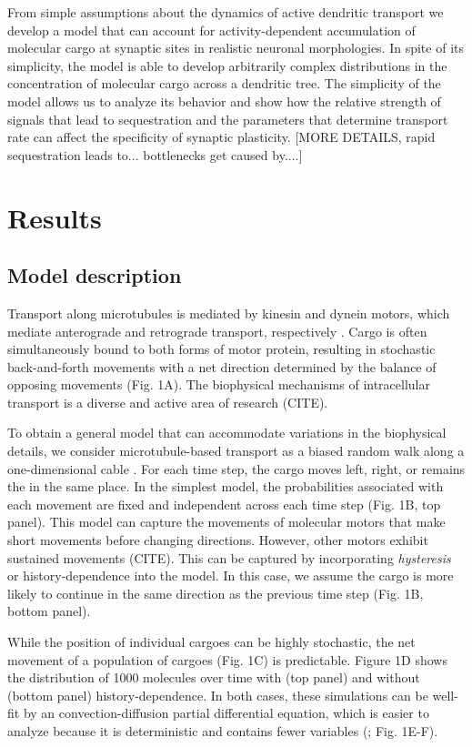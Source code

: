 \documentclass[fleqn,10pt]{wlpeerj}
\begin{document}
From simple assumptions about the dynamics of active dendritic transport we develop a model that can account for activity-dependent accumulation of molecular cargo at synaptic sites in realistic neuronal morphologies. In spite of its simplicity, the model is able to develop arbitrarily complex distributions in the concentration of molecular cargo across a dendritic tree. The simplicity of the model allows us to analyze its behavior and show how the relative strength of signals that lead to sequestration and the parameters that determine transport rate can affect the specificity of synaptic plasticity. [MORE DETAILS, rapid sequestration leads to... bottlenecks get caused by....]


\section*{Results}

\subsection*{Model description}

Transport along microtubules is mediated by kinesin and dynein motors, which mediate anterograde and retrograde transport, respectively \citep{Hirokawa_2010,Gagnon_2011}. Cargo is often simultaneously bound to both forms of motor protein, resulting in stochastic back-and-forth movements with a net direction determined by the balance of opposing movements \citep{Hancock_2014,Buxbaum_2014b} (Fig. 1A). The biophysical mechanisms of intracellular transport is a diverse and active area of research (CITE).

To obtain a general model that can accommodate variations in the biophysical details, we consider microtubule-based transport as a biased random walk along a one-dimensional cable \citep{Bressloff_2006}. For each time step, the cargo moves left, right, or remains the in the same place. In the simplest model, the probabilities associated with each movement are fixed and independent across each time step (Fig. 1B, top panel). This model can capture the movements of molecular motors that make short movements before changing directions. However, other motors exhibit sustained movements (CITE). This can be captured by incorporating \textit{hysteresis} or history-dependence into the model. In this case, we assume the cargo is more likely to continue in the same direction as the previous time step (Fig. 1B, bottom panel).

While the position of individual cargoes can be highly stochastic, the net movement of a population of cargoes (Fig. 1C) is predictable. Figure 1D shows the distribution of 1000 molecules over time with (top panel) and without (bottom panel) history-dependence. In both cases, these simulations can be well-fit by an convection-diffusion partial differential equation, which is easier to analyze because it is deterministic and contains fewer variables (\cite{Smith_2001}; Fig. 1E-F).
\end{document}

